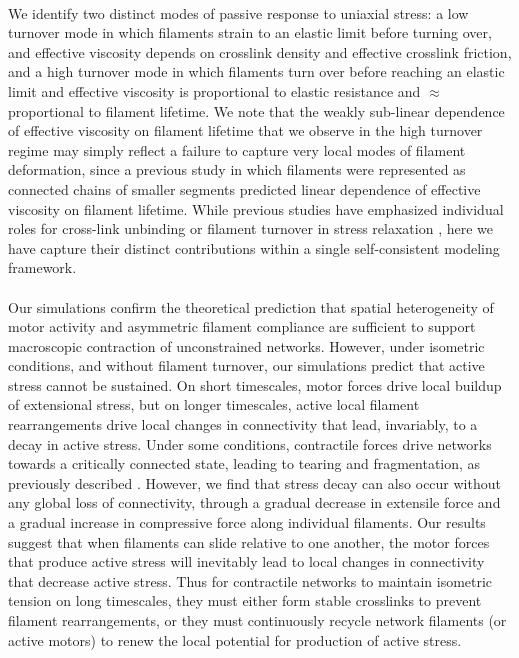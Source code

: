 \documentclass[10pt,letterpaper]{article}
\begin{document}
\paragraph{} We identify two distinct modes of passive response to uniaxial stress:  a low turnover mode in which filaments strain to an elastic limit before turning over, and effective viscosity depends on crosslink density and effective crosslink friction, and a high turnover mode in which filaments turn over before reaching an elastic limit and effective viscosity is proportional to elastic resistance and $\approx$ proportional to filament lifetime. We note that the weakly sub-linear dependence of effective viscosity on filament lifetime that we observe in the high turnover regime may simply reflect a failure to capture very local modes of filament deformation, since a previous study \cite{Kim2014526} in which filaments were represented as connected chains of smaller segments predicted linear dependence of effective viscosity on filament lifetime. While previous studies have emphasized individual roles for cross-link unbinding or filament turnover in stress relaxation \cite{De-La-Cruz:2015aa,De-La-Cruz:2009aa,Salbreux2012536}, here we have capture their distinct contributions within a single self-consistent modeling framework. 

\paragraph{} Our simulations confirm the theoretical prediction \cite{1367-2630-14-3-033037,rheo_2D1,rheo_active} that spatial heterogeneity of motor activity and asymmetric filament compliance are sufficient to support macroscopic contraction of unconstrained networks. However, under isometric conditions, and without filament turnover, our simulations predict that active stress cannot be sustained. On short timescales, motor forces drive local buildup of extensional stress, but on longer timescales, active local filament rearrangements drive local changes in connectivity that lead, invariably, to a decay in active stress.  Under some conditions, contractile forces drive networks towards a critically connected state, leading to tearing and fragmentation, as previously described \cite{Alvarado:2013aa, Mak:2016aa}. However, we find that stress decay can also occur without any global loss of connectivity, through a gradual decrease in extensile force and a gradual increase in compressive force along individual filaments.   Our results suggest that when filaments can slide relative to one another, the motor forces that produce active stress will inevitably lead to local changes in connectivity that decrease active stress.  Thus for contractile networks to maintain isometric tension on long timescales, they must either form stable crosslinks to prevent filament rearrangements, or they must continuously recycle network filaments (or active motors) to renew the local potential for production of active stress.
\end{document}
